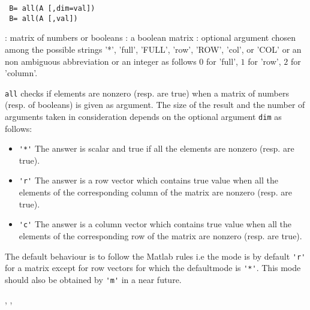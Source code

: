 \begin{mandesc}
\end{mandesc}

\begin{calling_sequence}
\begin{verbatim}
 B= all(A [,dim=val])
 B= all(A [,val])
\end{verbatim}
\end{calling_sequence}
\begin{parameters}
  \begin{varlist}
    :  matrix of numbers or booleans 
    : a boolean matrix 
    : optional argument chosen among the possible strings '*', 
    'full', 'FULL', 'row', 'ROW', 'col', or 'COL'  or an non ambiguous abbreviation or an 
    integer as follows $0$ for 'full', $1$ for 'row', $2$ for 'column'.
  \end{varlist}
\end{parameters}

\begin{mandescription}
  \verb!all! checks if elements are nonzero (resp. are true) when a matrix of numbers (resp. of booleans) 
  is given as argument. The size of the result and the number of arguments taken in consideration depends 
  on the optional argument \verb!dim! as follows:
  \begin{itemize}
  \item \verb!'*'! The answer is scalar and true if all the elements are nonzero (resp. are true).
  \item \verb!'r'! The answer is a row vector which contains true value when all the elements of 
    the corresponding column of the matrix are  nonzero (resp. are true). 
  \item \verb!'c'! The answer is a column vector which contains true value when all the elements of 
    the corresponding row of the matrix are  nonzero (resp. are true).
  \end{itemize}
  The default behaviour is to follow the Matlab rules i.e the mode is by default \verb!'r'! 
  for a matrix except for row vectors for which the defaultmode is \verb!'*'!. 
  This mode should also be obtained by \verb!'m'! in a near future. 
\end{mandescription}
\begin{manseealso}
  , , 
\end{manseealso}


